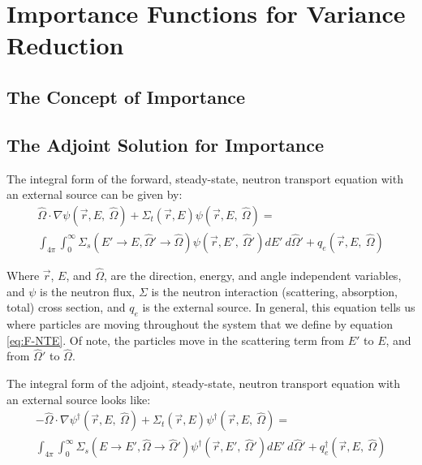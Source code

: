 \section{Importance Functions for Variance Reduction}
\label{sec:Importance}

\subsection{The Concept of Importance}



\subsection{The Adjoint Solution for Importance}
\label{sec:AdjointImportance}

The integral form of the forward, steady-state, neutron transport equation with an external source can be given by:
\begin{multline}
\hat\Omega \cdot \nabla \psi (\vec {r} ,E,\:\hat\Omega)+\Sigma _{ t }(\vec{r},E)\psi (\vec { r } ,E,\:\hat\Omega) = \\ 
\int _{ 4\pi  } \int _{ 0 }^{ \infty  } \Sigma _{ s }(E'\rightarrow E, \hat\Omega'\rightarrow\hat\Omega)\psi (\vec { r } ,E',\: \hat\Omega')dE' \:d\hat\Omega' + q_{e}(\vec { r } ,E, \:\hat\Omega)
\end{multline}
\label{eq:F-NTE}

Where $\vec { r }$, $E$, and $\hat\Omega$, are the direction, energy, and angle independent variables, and $\psi$ is the neutron flux, $\Sigma$ is the neutron interaction (scattering, absorption, total) cross section, and $q_{e}$ is the external source. In general, this equation tells us where particles are moving throughout the system that we define by equation \ref{eq:F-NTE}. Of note, the particles move in the scattering term from $E'$ to $E$, and from $\hat\Omega'$ to $\hat\Omega$. 

The integral form of the adjoint, steady-state, neutron transport equation with an external source looks like:
\begin{multline}
-\hat\Omega \cdot \nabla \psi^{\dagger} (\vec {r} ,E,\:\hat\Omega)+\Sigma _{ t }(\vec{r},E)\psi^{\dagger}  (\vec { r } ,E,\:\hat\Omega)
= \\  
 \int _{ 4\pi  } \int _{ 0 }^{ \infty  } \Sigma _{ s }(E\rightarrow E', \hat\Omega\rightarrow\hat\Omega')\psi^{\dagger}  (\vec { r } ,E',\: \hat\Omega')dE' \:d\hat\Omega' + q_{e}^\dagger(\vec { r } ,E, \:\hat\Omega)
\end{multline}
\label{eq:A-NTE}

